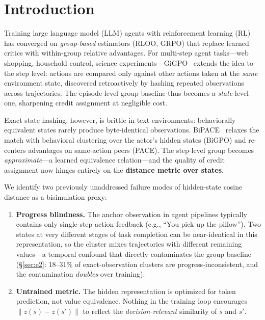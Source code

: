 \documentclass[sigconf]{acmart}
\begin{document}

\maketitle

\section{Introduction}
\label{sec:intro}

Training large language model (LLM) agents with reinforcement learning
(RL) has converged on \emph{group-based} estimators (RLOO, GRPO) that
replace learned critics with within-group relative advantages. For
multi-step agent tasks---web shopping, household control, science
experiments---GiGPO~\cite{gigpo} extends the idea to the step level:
actions are compared only against other actions taken at the
\emph{same} environment state, discovered retroactively by hashing
repeated observations across trajectories. The episode-level group
baseline thus becomes a \emph{state}-level one, sharpening credit
assignment at negligible cost.

Exact state hashing, however, is brittle in text environments:
behaviorally equivalent states rarely produce byte-identical
observations. BiPACE~\cite{bipace} relaxes the match with behavioral
clustering over the actor's hidden states (BiGPO) and re-centers
advantages on same-action peers (PACE). The step-level group becomes
\emph{approximate}---a learned equivalence relation---and the quality of
credit assignment now hinges entirely on the \textbf{distance metric
over states}.

We identify two previously unaddressed failure modes of hidden-state
cosine distance as a bisimulation proxy:

\begin{enumerate}
\item \textbf{Progress blindness.} The anchor observation in agent
pipelines typically contains only single-step action feedback
(e.g., ``You pick up the pillow''). Two states at very different stages
of task completion can be near-identical in this representation, so the
cluster mixes trajectories with different remaining values---a temporal
confound that directly contaminates the group baseline
(\S\ref{sec:e2}: 18--31\% of exact-observation clusters are
progress-inconsistent, and the contamination \emph{doubles} over
training).
\item \textbf{Untrained metric.} The hidden representation is optimized
for token prediction, not value equivalence. Nothing in the training
loop encourages $\|z(s)-z(s')\|$ to reflect the \emph{decision-relevant}
similarity of $s$ and $s'$.
\end{enumerate}
\end{document}
